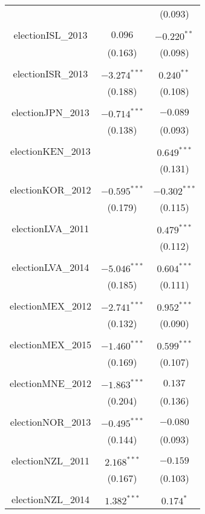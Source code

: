 \documentclass[12pt, titlepage]{article}
\begin{document}
\begin{longtable}[H]{ccc }
		&  & (0.093) \\ 
		& & \\ 
		electionISL\_2013 & $0.096$ & $-0.220^{**}$ \\ 
		& (0.163) & (0.098) \\ 
		& & \\ 
		electionISR\_2013 & $-3.274^{***}$ & $0.240^{**}$ \\ 
		& (0.188) & (0.108) \\ 
		& & \\ 
		electionJPN\_2013 & $-0.714^{***}$ & $-0.089 $\\ 
		& (0.138) & (0.093) \\ 
		& & \\ 
		electionKEN\_2013 &  & $0.649^{***}$\\ 
		&  & (0.131) \\ 
		& & \\ 
		electionKOR\_2012 & $-0.595^{***}$ & $-0.302^{***}$\\ 
		& (0.179) & (0.115) \\ 
		& & \\ 
		electionLVA\_2011 &  & $0.479^{***}$ \\ 
		&  & (0.112) \\ 
		& & \\ 
		electionLVA\_2014 & $-5.046^{***}$ & $0.604^{***} $\\ 
		& (0.185) & (0.111) \\ 
		& & \\ 
		electionMEX\_2012 & $-2.741^{***}$ & $0.952^{***}$ \\ 
		& (0.132) & (0.090) \\ 
		& & \\ 
		electionMEX\_2015 & $-1.460^{***}$ & $0.599^{***}$ \\ 
		& (0.169) & (0.107) \\ 
		& & \\ 
		electionMNE\_2012 & $-1.863^{***}$ & $0.137$ \\ 
		& (0.204) & (0.136) \\ 
		& & \\ 
		electionNOR\_2013 & $-0.495^{***}$ & $-0.080 $\\ 
		& (0.144) & (0.093) \\ 
		& & \\ 
		electionNZL\_2011 & $2.168^{***}$ & $-0.159$ \\ 
		& (0.167) & (0.103) \\ 
		& & \\ 
		electionNZL\_2014 & $1.382^{***}$ & $0.174^{*}$ \\ 

\end{longtable}
\end{document}
